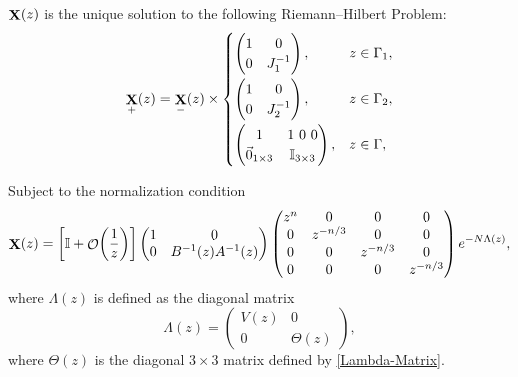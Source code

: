 \documentclass[10pt,a4paper]{amsart}
\DeclareMathOperator{\OO}{\mathcal{O}}
\DeclareMathOperator{\XX}{{\bf X}}
\begin{document}
 \begin{Proposition}
 $\XX(z)$ is the unique solution to the following Riemann--Hilbert Problem:
 \begin{equation*}
 \XX_{+}(z) = \XX_{-}(z) \times
 \begin{cases}
 \begin{pmatrix}
 1 & 0\\
 0 & J_1^{-1}
 \end{pmatrix}, & z \in \Gamma_1,\vspace{1mm}\\
 \begin{pmatrix}
 1 & 0\\
 0 & J_2^{-1}
 \end{pmatrix}, & z \in \Gamma_2,\vspace{1mm}\\
 \begin{pmatrix}
 1 & 1 \ 0 \ 0\\
 \vec{0}_{1\times 3} & \mathbb{I}_{3\times3}
 \end{pmatrix}, & z \in \Gamma,\\
 \end{cases}
 \end{equation*}

 Subject to the normalization condition
 \begin{align}\label{X-asymptotics}
 \XX(z) =
 \biggl[\mathbb{I} + \OO\biggl(\frac{1}{z}\biggr)\biggr]\begin{pmatrix}
 1 & 0\\
 0 & B^{-1}(z) A^{-1}(z)
 \end{pmatrix}
 \begin{pmatrix}
 z^n & 0 & 0 & 0\\
 0 & z^{-n/3} & 0 & 0\\
 0 & 0 & z^{-n/3} & 0\\
 0 & 0 & 0 & z^{-n/3}
 \end{pmatrix}{\rm e}^{-N\Lambda(z)},
 \end{align}
where $\Lambda(z)$ is defined as the diagonal matrix
 \begin{equation*}
 \Lambda(z) =
 \begin{pmatrix}
 V(z) & 0\\
 0 & \Theta(z)
 \end{pmatrix},
 \end{equation*}
where $\Theta(z)$ is the diagonal $3\times 3$ matrix defined by \eqref{Lambda-Matrix}.
 \end{Proposition}
\end{document}
